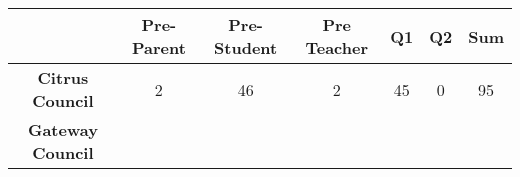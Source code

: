 \documentclass[]{article}
\begin{document}
\begin{longtable}[]{@{}ccccccc@{}}
\toprule
\begin{minipage}[b]{0.26\columnwidth}\centering\strut
~\strut
\end{minipage} & \begin{minipage}[b]{0.13\columnwidth}\centering\strut
Pre-Parent\strut
\end{minipage} & \begin{minipage}[b]{0.14\columnwidth}\centering\strut
Pre-Student\strut
\end{minipage} & \begin{minipage}[b]{0.14\columnwidth}\centering\strut
Pre Teacher\strut
\end{minipage} & \begin{minipage}[b]{0.05\columnwidth}\centering\strut
Q1\strut
\end{minipage} & \begin{minipage}[b]{0.05\columnwidth}\centering\strut
Q2\strut
\end{minipage} & \begin{minipage}[b]{0.05\columnwidth}\centering\strut
Sum\strut
\end{minipage}\tabularnewline
\midrule
\endhead
\begin{minipage}[t]{0.26\columnwidth}\centering\strut
\textbf{Citrus Council}\strut
\end{minipage} & \begin{minipage}[t]{0.13\columnwidth}\centering\strut
2\strut
\end{minipage} & \begin{minipage}[t]{0.14\columnwidth}\centering\strut
46\strut
\end{minipage} & \begin{minipage}[t]{0.14\columnwidth}\centering\strut
2\strut
\end{minipage} & \begin{minipage}[t]{0.05\columnwidth}\centering\strut
45\strut
\end{minipage} & \begin{minipage}[t]{0.05\columnwidth}\centering\strut
0\strut
\end{minipage} & \begin{minipage}[t]{0.05\columnwidth}\centering\strut
95\strut
\end{minipage}\tabularnewline
\begin{minipage}[t]{0.26\columnwidth}\centering\strut
\textbf{Gateway Council}\strut
\end{minipage} & \begin{minipage}[t]{0.13\columnwidth}\centering\strut

\end{minipage}
\end{longtable}
\end{document}

